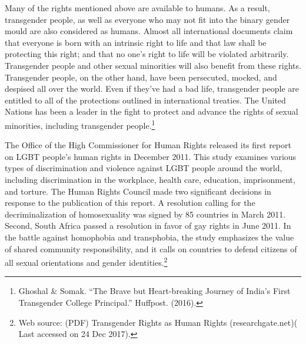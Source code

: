 \begin{multicols}{2}


\vspace{-.15cm}

\noi
Many of the rights mentioned above are available to humans. As a result, transgender people,
as well as everyone who may not fit into the binary gender mould are also considered as
humans. Almost all international documents claim that everyone is born with an intrinsic right
to life and that law shall be protecting this right; and that no one's right to life will be violated
arbitrarily. Transgender people and other sexual minorities will also benefit from these rights.
Transgender people, on the other hand, have been persecuted, mocked, and despised all over
the world. Even if they've had a bad life, transgender people are entitled to all of the protections
outlined in international treaties. The United Nations has been a leader in the fight to protect
and advance the rights of sexual minorities, including transgender people.\footnote{Ghoshal \& Somak. “The Brave but Heart-breaking Journey of India’s First Transgender College Principal.” Huffpost. (2016).}

\vspace{-.15cm}

\noi
The Office of the High Commissioner for Human Rights released its first report on LGBT
people's human rights in December 2011. This study examines various types of discrimination
and violence against LGBT people around the world, including discrimination in the
workplace, health care, education, imprisonment, and torture. The Human Rights Council made
two significant decisions in response to the publication of this report. A resolution calling for
the decriminalization of homosexuality was signed by 85 countries in March 2011. Second,
South Africa passed a resolution in favor of gay rights in June 2011. In the battle against
homophobia and transphobia, the study emphasizes the value of shared community
responsibility, and it calls on countries to defend citizens of all sexual orientations and gender
identities.\footnote{Web source: (PDF) Transgender Rights as Human Rights (researchgate.net)( Last accessed on 24 Dec 2017).}

\vspace{-.15cm}


\end{multicols}
